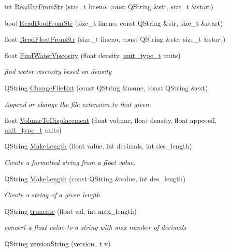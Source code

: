 \begin{DoxyCompactItemize}
\item 
int \hyperlink{namespaceShipCAD_a70b238d926183460670b82d9680b5cb9}{Read\-Int\-From\-Str} (size\-\_\-t lineno, const Q\-String \&str, size\-\_\-t \&start)
\item 
bool \hyperlink{namespaceShipCAD_af343b5a2dfd09b32b9451d35e0676384}{Read\-Bool\-From\-Str} (size\-\_\-t lineno, const Q\-String \&str, size\-\_\-t \&start)
\item 
float \hyperlink{namespaceShipCAD_a696bc38864a736dda734802f3cda4346}{Read\-Float\-From\-Str} (size\-\_\-t lineno, const Q\-String \&str, size\-\_\-t \&start)
\item 
float \hyperlink{namespaceShipCAD_a44025ef38e6ee9f12cbf032660f637b5}{Find\-Water\-Viscosity} (float density, \hyperlink{namespaceShipCAD_ac6a7a28b4b063771afae92decb602da5}{unit\-\_\-type\-\_\-t} units)
\begin{DoxyCompactList}\small\item\em find water viscosity based on density \end{DoxyCompactList}\item 
Q\-String \hyperlink{namespaceShipCAD_ae416df4a72579eb3a1a418b19551eb53}{Change\-File\-Ext} (const Q\-String \&name, const Q\-String \&ext)
\begin{DoxyCompactList}\small\item\em Append or change the file extension to that given. \end{DoxyCompactList}\item 
float \hyperlink{namespaceShipCAD_ad3ca198e79658bf065f1c1c416f23670}{Volume\-To\-Displacement} (float volume, float density, float appcoeff, \hyperlink{namespaceShipCAD_ac6a7a28b4b063771afae92decb602da5}{unit\-\_\-type\-\_\-t} units)
\item 
Q\-String \hyperlink{namespaceShipCAD_ae378a523725f5718c9f2b55103f08dcb}{Make\-Length} (float value, int decimals, int des\-\_\-length)
\begin{DoxyCompactList}\small\item\em Create a formatted string from a float value. \end{DoxyCompactList}\item 
Q\-String \hyperlink{namespaceShipCAD_ab520595d533b1626c8be82c0efd24e6d}{Make\-Length} (const Q\-String \&value, int des\-\_\-length)
\begin{DoxyCompactList}\small\item\em Create a string of a given length. \end{DoxyCompactList}\item 
Q\-String \hyperlink{namespaceShipCAD_a83d943939c1d84473bb904360116f7be}{truncate} (float val, int max\-\_\-length)
\begin{DoxyCompactList}\small\item\em convert a float value to a string with max number of decimals \end{DoxyCompactList}\item 
Q\-String \hyperlink{namespaceShipCAD_a2901c6bb3e9ddd7efa9bdcc9095cc468}{version\-String} (\hyperlink{namespaceShipCAD_af3a6fa23a7318acbda7b0066b53d694f}{version\-\_\-t} v)
\end{DoxyCompactItemize}
